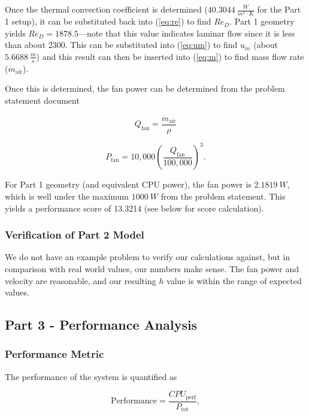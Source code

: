 \documentclass[12pt, titlepage]{article}
\begin{document}
Once the thermal convection coefficient is determined ($40.3044\ \tfrac{W}{m^2\cdot K}$ for the Part 1 setup), it can be substituted back into (\ref{eq:re}) to find $Re_D$. Part 1 geometry yields $Re_D = 1878.5$---note that this value indicates laminar flow since it is less than about 2300. This can be substituted into (\ref{eq:um}) to find $u_m$ (about $5.6688\ \tfrac{m}{s}$) and this result can then be inserted into (\ref{eq:m}) to find mass flow rate ($\dot{m}_{\text{air}}$).

Once this is determined, the fan power can be determined from the problem statement document

\begin{equation}
Q_{\text{fan}} = \frac{\dot{m}_{\text{air}}}{\rho}
\end{equation}

\begin{equation}
P_{\text{fan}} = 10{,}000 \left(\frac{Q_{\text{fan}}}{100{,}000}\right)^3.
\end{equation}

For Part 1 geometry (and equivalent CPU power), the fan power is $2.1819\ W$, which is well under the maximum $1000\ W$ from the problem statement. This yields a performance score of 13.3214 (see below for score calculation).

\subsubsection{Verification of Part 2 Model}

We do not have an example problem to verify our calculations against, but in comparison with real world values, our numbers make sense. The fan power and velocity are reasonable, and our resulting $h$ value is within the range of expected values.

\subsection{Part 3 - Performance Analysis}

\subsubsection{Performance Metric}

The performance of the system is quantified as

\begin{equation}
\text{Performance} = \frac{CPU_{\text{perf}}}{P_{\text{tot}}},
\end{equation}
\end{document}
